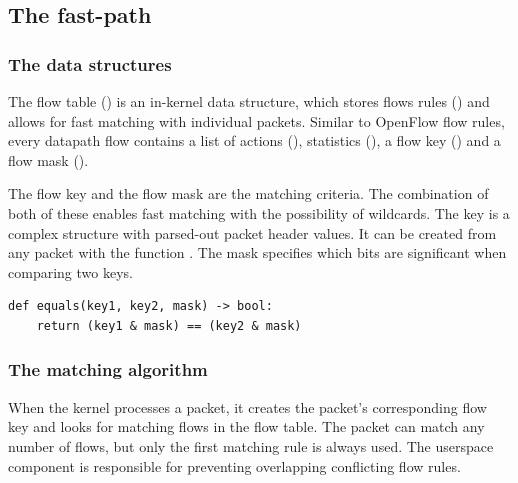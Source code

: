 \subsection{The fast-path}
\label{the-fast-path}

\subsubsection{The data structures}
\label{the-data-structures}

The flow table (\href{https://elixir.bootlin.com/linux/v6.2.6/source/net/openvswitch/flow_table.h\#L62}{}) is an in-kernel data structure, which stores flows rules (\href{https://elixir.bootlin.com/linux/v6.2.6/source/net/openvswitch/flow.h\#L221}{}) and allows for fast matching with individual packets. Similar to OpenFlow flow rules, every datapath flow contains a list of actions (\href{https://elixir.bootlin.com/linux/v6.2.6/source/net/openvswitch/flow.h\#L206}{}), statistics (\href{https://elixir.bootlin.com/linux/v6.2.6/source/net/openvswitch/flow.h\#L213}{}), a flow key (\href{https://elixir.bootlin.com/linux/v6.2.6/source/net/openvswitch/flow.h\#L75}{}) and a flow mask (\href{https://elixir.bootlin.com/linux/v6.2.6/source/net/openvswitch/flow.h\#L183}{}).

The flow key and the flow mask are the matching criteria. The combination of both of these enables fast matching with the possibility of wildcards. The key is a complex structure with parsed-out packet header values. It can be created from any packet with the function \href{https://elixir.bootlin.com/linux/v6.2.6/source/net/openvswitch/flow.c\#L886}{}. The mask specifies which bits are significant when comparing two keys.

\begin{verbatim}
def equals(key1, key2, mask) -> bool:
    return (key1 & mask) == (key2 & mask)
\end{verbatim}


\subsubsection{The matching algorithm}
\label{subsec:matching-algo}

When the kernel processes a packet, it creates the packet's corresponding flow key and looks for matching flows in the flow table. The packet can match any number of flows, but only the first matching rule is always used. The userspace component is responsible for preventing overlapping conflicting flow rules.


